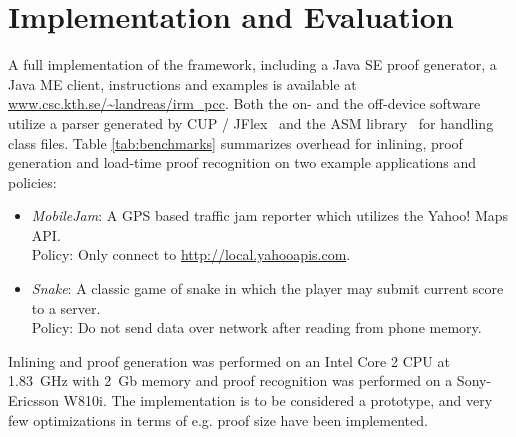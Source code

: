 \documentclass[10pt,twocolumn]{article}
\newcommand{\Policy}{\mathcal{P}}
\begin{document}
\section{Implementation and Evaluation}
A full implementation of the framework, including a Java SE proof generator, a Java ME client, instructions and examples is available at \url{www.csc.kth.se/~landreas/irm_pcc}. Both the on- and the off-device software utilize a parser generated by CUP / JFlex~\cite{cup,jflex} and the ASM library~\cite{asm} for handling class files. Table \ref{tab:benchmarks} summarizes overhead for inlining, proof generation and load-time proof recognition on two example applications and policies:
\begin{itemize}
\item \emph{MobileJam}: A GPS based traffic jam reporter which utilizes the Yahoo! Maps API.\\Policy: Only connect to \url{http://local.yahooapis.com}.
\item \emph{Snake}: A classic game of snake in which the player may submit current score to a server.\\Policy: Do not send data over network after reading from phone memory.
\end{itemize}
\begin{table}
\caption{\label{tab:benchmarks} Benchmarks for the two case studies.}
\end{table}

Inlining and proof generation was performed on an Intel Core 2 CPU at 1.83~GHz with 2~Gb memory and proof recognition was performed on a Sony-Ericsson W810i. The implementation is to be considered a prototype, and very few optimizations in terms of e.g. proof size have been implemented.
\end{document}
